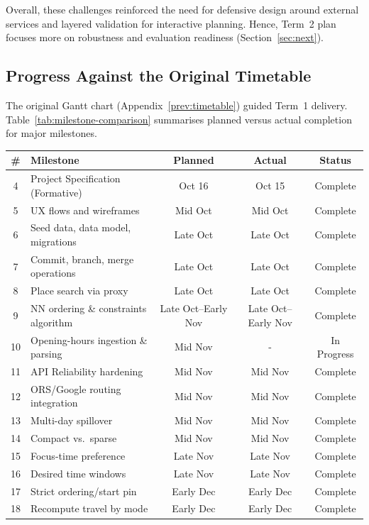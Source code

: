 Overall, these challenges reinforced the need for defensive design around external services and layered validation for interactive planning. Hence, Term~2 plan focuses more on robustness and evaluation readiness (Section~\ref{sec:next}).

\subsection{Progress Against the Original Timetable}
\label{progress-against-original}
The original Gantt chart (Appendix~\ref{prev:timetable}) guided Term~1 delivery. Table~\ref{tab:milestone-comparison} summarises planned versus actual completion for major milestones.

\begin{table}[H]
\centering
\begin{tabularx}{\textwidth}{c X c c c}
\toprule
\textbf{\#} & \textbf{Milestone} & \textbf{Planned} & \textbf{Actual} & \textbf{Status}\\
\midrule
4 & Project Specification (Formative) & Oct 16 & Oct 15 & Complete\\
5 & UX flows and wireframes & Mid Oct & Mid Oct & Complete\\
6 & Seed data, data model, migrations & Late Oct & Late Oct & Complete\\
7 & Commit, branch, merge operations & Late Oct & Late Oct & Complete\\
8 & Place search via proxy & Late Oct & Late Oct & Complete\\
9 & NN ordering \& constraints algorithm & Late Oct--Early Nov & Late Oct--Early Nov & Complete\\
10 & Opening-hours ingestion \& parsing & Mid Nov & - & In Progress\\
11 & API Reliability hardening & Mid Nov & Mid Nov & Complete\\
12 & ORS/Google routing integration & Mid Nov & Mid Nov & Complete\\
13 & Multi-day spillover & Mid Nov & Mid Nov & Complete\\
14 & Compact vs.\ sparse & Mid Nov & Mid Nov & Complete\\
15 & Focus-time preference & Late Nov & Late Nov & Complete\\
16 & Desired time windows & Late Nov & Late Nov & Complete\\
17 & Strict ordering/start pin & Early Dec & Early Dec & Complete\\
18 & Recompute travel by mode & Early Dec & Early Dec & Complete\\

\end{tabularx}
\end{table}
